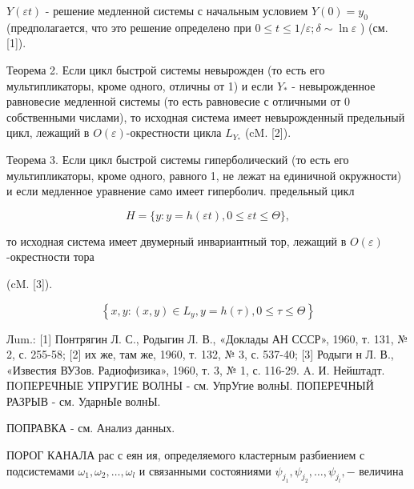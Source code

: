 \documentclass[10pt]{article}
\begin{document}
$Y(\varepsilon t)$ - решение медленной системы с начальным условием $Y(0)=y_{0}$ (предполагается, что это решение определено при $0 \leqslant t \leqslant 1 / \varepsilon ; \delta \sim \ln \varepsilon$ ) (см. [1]).



Теорема 2. Если цикл быстрой системы невырожден (то есть его мультипликаторы, кроме одного, отличны от 1) и если $Y_{*}$ - невырожденное равновесие медленной системы (то есть равновесие с отличными от 0 собственными числами), то исходная система имеет невырожденный предельный цикл, лежащий в $O(\varepsilon)$-окрестности цикла $L_{Y_{*}}$ (cM. [2]).



Теорема 3. Если цикл быстрой системы гиперболический (то есть его мультипликаторы, кроме одного, равного 1, не лежат на единичной окружности) и если медленное уравнение само имеет гиперболич. предельный цикл



\[

H=\{y: y=h(\varepsilon t), 0 \leqslant \varepsilon t \leqslant \Theta\},

\]



то исходная система имеет двумерный инвариантный тор, лежащий в $O(\varepsilon)$-окрестности тора



(cM. [3]).



\[

\left\{x, y:(x, y) \in L_{y}, y=h(\tau), 0 \leqslant \tau \leqslant \Theta\right\}

\]



Лum.: [1] Понтрягин Л. С., Родыгин Л. В., «Доклады АН СССР», 1960, т. 131, № 2, с. 255-58; [2] их же, там же, 1960, т. 132, № 3, с. 537-40; [3] Родыги н Л. В., «Известия ВУЗов. Радиофизика», 1960, т. 3, № 1, с. 116-29. A. И. Нейштадт. ПOПЕРЕЧНЫЕ УПРУГИЕ ВОЛНЫ - см. УпрУгие волнЫ. ПОПЕРЕЧНЫЙ РАЗРЫВ - см. УдарнЫе волнЫ.



ПОПРАВКА - см. Анализ данных.



ПОРОГ КАНАЛА рас с еян ия, определяемого кластерным разбиением с подсистемами $\omega_{1}, \omega_{2}, \ldots, \omega_{l}$ и связанными состояниями $\psi_{j_{1}}, \psi_{j_{2}}, \ldots, \psi_{j_{l}},-$ величина
\end{document}
